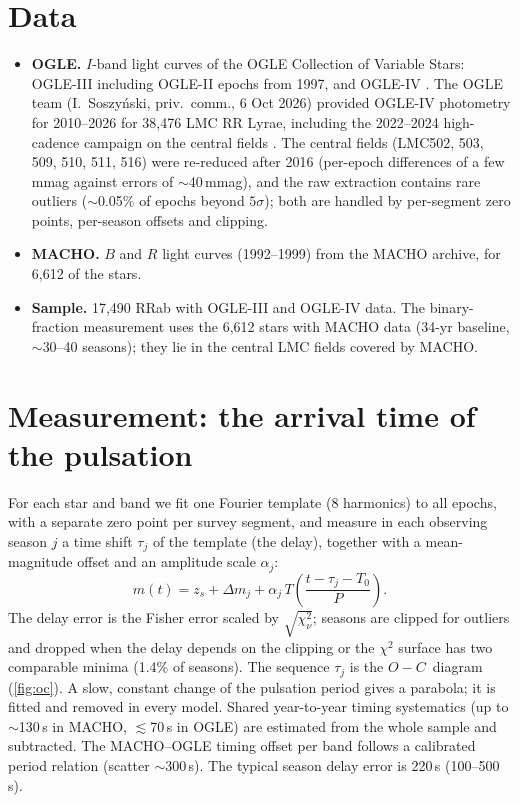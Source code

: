 \documentclass[11pt]{article}
\newcommand{\OC}{\ensuremath{O{-}C}}
\begin{document}
\section{Data}\label{sec:data}
\begin{itemize}[leftmargin=*]
\item \textbf{OGLE.} $I$-band light curves of the OGLE Collection of Variable Stars: OGLE-III
\citep{Soszynski2009} including OGLE-II epochs from 1997, and OGLE-IV \citep{Soszynski2016}. The OGLE team (I.~Soszy\'nski,
priv.\ comm., 6 Oct 2026) provided OGLE-IV photometry for 2010--2026 for 38{,}476 LMC RR Lyrae, including the
2022--2024 high-cadence campaign on the central fields \citep{Mroz2024}. The central fields (LMC502, 503, 509, 510, 511, 516) were re-reduced
after 2016 (per-epoch differences of a few mmag against errors of $\sim$40\,mmag), and the raw extraction contains rare
outliers ($\sim$0.05\% of epochs beyond $5\sigma$); both are handled by per-segment zero points, per-season offsets and
clipping.
\item \textbf{MACHO.} $B$ and $R$ light curves (1992--1999) from the MACHO archive, for 6{,}612 of the stars.
\item \textbf{Sample.} 17{,}490 RRab with OGLE-III and OGLE-IV data. The binary-fraction measurement uses the 6{,}612 stars
with MACHO data (34-yr baseline, $\sim$30--40 seasons); they lie in the central LMC fields covered by MACHO.
\end{itemize}

\section{Measurement: the arrival time of the pulsation}\label{sec:measurement}
For each star and band we fit one Fourier template (8 harmonics) to all epochs, with a separate zero point per survey
segment, and measure in each observing season $j$ a time shift $\tau_j$ of the template (the delay), together with a mean-magnitude
offset and an amplitude scale $\alpha_j$:
\begin{equation}
m(t) = z_s + \Delta m_j + \alpha_j\, T\!\left(\frac{t-\tau_j-T_0}{P}\right).
\end{equation}
The delay error is the Fisher error scaled by $\sqrt{\chi^2_\nu}$; seasons are clipped for outliers and dropped when the delay
depends on the clipping or the $\chi^2$ surface has two comparable minima (1.4\% of seasons). The sequence $\tau_j$ is the \OC\
diagram (\cref{fig:oc}). A slow, constant change of the pulsation period gives a parabola; it is fitted and removed in every model.
Shared year-to-year timing systematics (up to $\sim$130\,s in MACHO, $\lesssim$70\,s in OGLE) are estimated from the whole
sample and subtracted. The MACHO--OGLE timing offset per band follows a calibrated period relation (scatter $\sim$300\,s).
The typical season delay error is 220\,s (100--500\,s).
\end{document}

